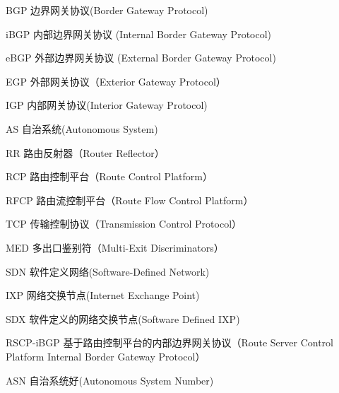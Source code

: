 \begin{denotation}[3cm]
\item[BGP] 边界网关协议(Border Gateway Protocol)
\item[iBGP] 内部边界网关协议 (Internal Border Gateway Protocol)
\item[eBGP] 外部边界网关协议 (External Border Gateway Protocol)
\item[EGP] 外部网关协议（Exterior Gateway Protocol）
\item[IGP] 内部网关协议(Interior Gateway Protocol)
\item[AS] 自治系统(Autonomous System)
\item[RR] 路由反射器（Router Reflector）
\item[RCP] 路由控制平台（Route Control Platform）
\item[RFCP] 路由流控制平台（Route Flow Control Platform）
\item[TCP] 传输控制协议（Transmission Control Protocol）
\item[MED] 多出口鉴别符（Multi-Exit Discriminators）
\item[SDN] 软件定义网络(Software-Defined Network)
\item[IXP] 网络交换节点(Internet Exchange Point)
\item[SDX] 软件定义的网络交换节点(Software Defined IXP)
\item[RSCP-iBGP] 基于路由控制平台的内部边界网关协议（Route Server Control Platform Internal Border Gateway Protocol）
\item[ASN] 自治系统好(Autonomous System Number)
\end{denotation}
